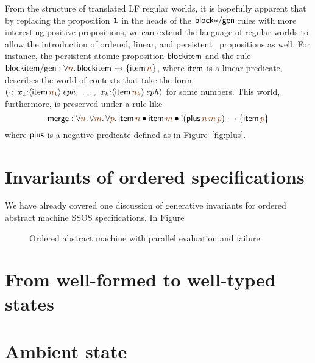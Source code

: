 From the structure of translated LF regular worlds, it is hopefully
apparent that by replacing the proposition $\mathbf{1}$ in the heads of the
${\sf block{*}/gen}$ rules with more interesting positive
\sls propositions,  we can extend the language of regular
worlds to allow the introduction of ordered, linear, and persistent
\sls~propositions as well. For instance, the persistent atomic proposition
${\sf blockitem}$ and the rule
${\sf blockitem/gen} : 
\forall \lf{n}. \, {\sf blockitem} \lefti \{ {\sf item}\,\lf{n} \}$,
where ${\sf item}$ is a linear predicate,
describes the world of contexts that take the form
$\left(\cdot; ~ x_1{:}\iseph{\susp{{\sf item}\,\lf{n_1}}}, ~
         \ldots, ~
         x_k{:}\iseph{\susp{{\sf item}\,\lf{n_k}}}\right)$
for some numbers. This world, furthermore, is preserved
under a rule like 
\[
  {\sf merge} : 
  \forall \lf{n}.\,\forall\lf{m}.\,\forall\lf{p}.\,
   {\sf item}\,\lf{n} \fuse
   {\sf item}\,\lf{m} \fuse
   {!}({\sf plus}\,\lf{n}\,\lf{m}\,\lf{p}) 
    \lefti \{ {\sf item}\,\lf{p} \}
\]
where ${\sf plus}$ is a negative predicate defined as in 
Figure~\ref{fig:plus}.


\section{Invariants of ordered specifications}

We have already covered one discussion of generative invariants for 
ordered abstract machine SSOS specifications. In Figure 

\begin{figure}[t]
\caption{Ordered abstract machine with parallel evaluation and failure}
\label{fig:ssos-fail}
\end{figure}


\section{From well-formed to well-typed states}

\section{Ambient state}



